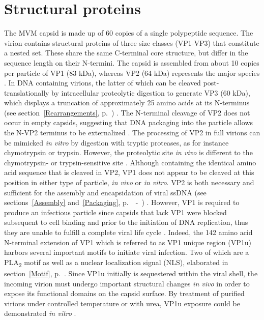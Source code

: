 \section{Structural proteins}

The MVM capsid is made up of 60 copies of a single polypeptide sequence. The virion contains structural proteins of three size classes (VP1-VP3) that constitute a nested set. These share the same C-terminal core structure, but differ in the sequence length on their N-termini. The capsid is assembled from about 10 copies per particle of VP1 (83 kDa), whereas VP2 (64 kDa) represents the major species \cite{pmid988192}. In DNA containing virions, the latter of which can be cleaved post-translationally by intracellular proteolytic digestion to generate VP3 (60 kDa), which displays a truncation of approximately 25 amino acids at its N-terminus (see section~\ref{Rearrangements}, p.~\pageref{Rearrangements}) \cite{pmid864702, pmid1448928, pmid982825, pmid9770425}. The N-terminal cleavage of VP2 does not occur in empty capsids, suggesting that DNA packaging into the particle allows the N-VP2 terminus to be externalized \cite{pmid3296697, pmid6481856, pmid864702}. The processing of VP2 in full virions can be mimicked \textit{in vitro} by digestion with tryptic proteases, as for instance chymotrypsin or trypsin. However, the proteolytic site \textit{in vivo} is different to the chymotrypsin- or trypsin-sensitive site \cite{pmid6481856, pmid864702, pmid1448928}. Although containing the identical amino acid sequence that is cleaved in VP2, VP1 does not appear to be cleaved at this position in either type of particle, \textit{in vivo} or \textit{in vitro}. VP2 is both necessary and sufficient for the assembly and encapsidation of viral ssDNA (see sections~\ref{Assembly} and~\ref{Packaging}, p.~\pageref{Assembly}~-~\pageref{Packaging}) \cite{pmid10662625}. However, VP1 is required to produce an infectious particle since capsids that lack VP1 were blocked subsequent to cell binding and prior to the initiation of DNA replication, thus they are unable to fulfill a complete viral life cycle \cite{pmid8416366}. Indeed, the 142 amino acid N-terminal extension of VP1 which is referred to as VP1 unique region (VP1u) harbors several important motifs to initiate viral infection. Two of which are a PLA\textsubscript{2} motif as well as a nuclear localization signal (NLS), elaborated in section~\ref{Motif}, p.~\pageref{Motif}. Since VP1u initially is sequestered within the viral shell, the incoming virion must undergo important structural changes \textit{in vivo} in order to expose its functional domains on the capsid surface. By treatment of purified virions under controlled temperature or with urea, VP1u exposure could be demonstrated \textit{in vitro} \cite{pmid9927584, pmid15194745}. 
    
